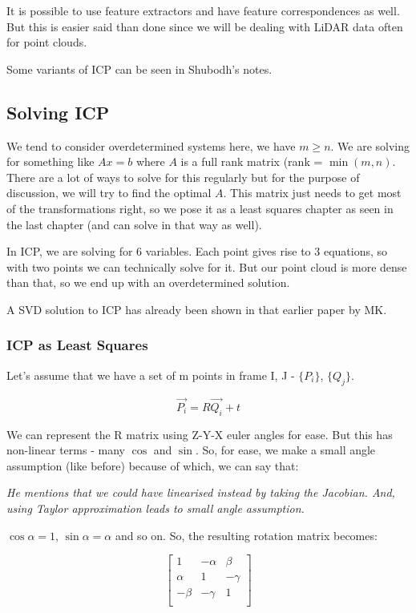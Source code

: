 It is possible to use feature extractors and have feature correspondences as well. But this is easier said than done since we will be dealing with LiDAR data often for point clouds.

Some variants of ICP can be seen in Shubodh's notes. 

\subsection{Solving ICP}

We tend to consider overdetermined systems here, we have $m\geq n$. We are solving for something like $Ax=b$ where $A$ is a full rank matrix (rank = $\min (m, n)$. There are a lot of ways to solve for this regularly but for the purpose of discussion, we will try to find the optimal $A$. This matrix just needs to get most of the transformations right, so we pose it as a least squares chapter as seen in the last chapter (and can solve in that way as well).

In ICP, we are solving for 6 variables. Each point gives rise to 3 equations, so with two points we can technically solve for it. But our point cloud is more dense than that, so we end up with an overdetermined solution. 

A SVD solution to ICP has already been shown in that earlier paper by MK.

\subsubsection{ICP as Least Squares}

Let's assume that we have a set of m points in frame I, J - $\{P_i\}$, $\{Q_j\}$.

\begin{equation}
    \Vec{P_i} = R\Vec{Q_i} + t
\end{equation}

We can represent the R matrix using Z-Y-X euler angles for ease. But this has non-linear terms - many $\cos$ and $\sin$. So, for ease, we make a small angle assumption (like before) because of which, we can say that:

\textit{He mentions that we could have linearised instead by taking the Jacobian. And, using Taylor approximation leads to small angle assumption.}

$\cos \alpha = 1$, $\sin \alpha = \alpha$ and so on. So, the resulting rotation matrix becomes:

\begin{equation}
\begin{bmatrix}
1 & -\alpha & \beta \\
\alpha & 1 & -\gamma \\
-\beta & -\gamma & 1\\
\end{bmatrix}
\end{equation}

